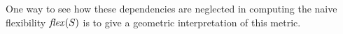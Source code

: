% 

One way to see how these dependencies are neglected in computing the naive flexibility $\mathit{flex}(S)$ is to give a geometric interpretation of this metric.  
 
